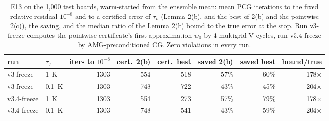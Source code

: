 \begin{table}[t]\centering\small
\begin{adjustbox}{max width=\linewidth}\begin{tabular}{llrrrrrr}
\hline
run & $\tau_v$ & iters to $10^{-8}$ & cert.\ 2(b) & cert.\ best & saved 2(b) & saved best & bound/true \\
\hline
v3-freeze & 1~K & 1303 & 554 & 518 & 57\% & 60\% & 178$\times$ \\
v3-freeze & 0.1~K & 1303 & 748 & 722 & 43\% & 45\% & 204$\times$ \\
v3.4-freeze & 1~K & 1303 & 554 & 273 & 57\% & 79\% & 178$\times$ \\
v3.4-freeze & 0.1~K & 1303 & 748 & 541 & 43\% & 59\% & 204$\times$ \\
\hline
\end{tabular}\end{adjustbox}
\caption{E13 on the 1{,}000 test boards, warm-started from the ensemble mean: mean PCG iterations to the fixed relative residual $10^{-8}$ and to a certified error of $\tau_v$ (Lemma 2(b), and the best of 2(b) and the pointwise 2(c)), the saving, and the median ratio of the Lemma 2(b) bound to the true error at the stop. Run v3-freeze computes the pointwise certificate's first approximation $w_0$ by 4 multigrid V-cycles, run v3.4-freeze by AMG-preconditioned CG. Zero violations in every run.}
\label{tab:e13}
\end{table}
